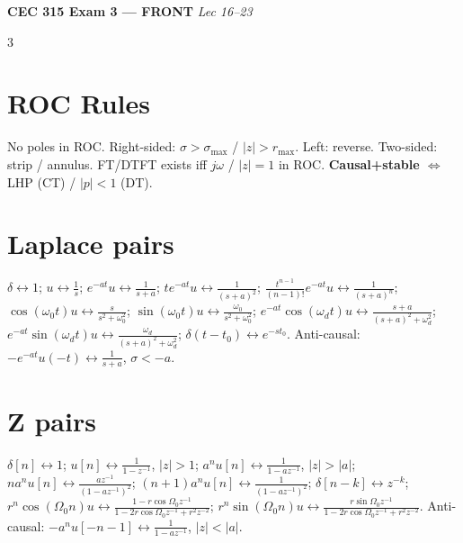 \documentclass[8pt]{extarticle}
\begin{document}
\scriptsize

\begin{center}\textbf{\footnotesize CEC 315 Exam 3 --- FRONT} \hfill \emph{Lec 16--23}\end{center}
\vspace{-4pt}

\begin{multicols*}{3}

\section*{ROC Rules}
No poles in ROC. Right-sided: $\sigma>\sigma_{\max}$ / $|z|>r_{\max}$. Left: reverse. Two-sided: strip / annulus. FT/DTFT exists iff $j\omega$ / $|z|{=}1$ in ROC. \textbf{Causal+stable $\Leftrightarrow$} LHP (CT) / $|p|{<}1$ (DT).

\section*{Laplace pairs}
$\delta\!\leftrightarrow\!1$;
$u\!\leftrightarrow\!\tfrac1s$;
$e^{-at}u\!\leftrightarrow\!\tfrac{1}{s+a}$;
$te^{-at}u\!\leftrightarrow\!\tfrac{1}{(s+a)^2}$;
$\tfrac{t^{n-1}}{(n-1)!}e^{-at}u\!\leftrightarrow\!\tfrac{1}{(s+a)^n}$;
$\cos(\omega_0 t)u\!\leftrightarrow\!\tfrac{s}{s^2+\omega_0^2}$;
$\sin(\omega_0 t)u\!\leftrightarrow\!\tfrac{\omega_0}{s^2+\omega_0^2}$;
$e^{-at}\cos(\omega_d t)u\!\leftrightarrow\!\tfrac{s+a}{(s+a)^2+\omega_d^2}$;
$e^{-at}\sin(\omega_d t)u\!\leftrightarrow\!\tfrac{\omega_d}{(s+a)^2+\omega_d^2}$;
$\delta(t{-}t_0)\!\leftrightarrow\!e^{-st_0}$.
Anti-causal: $-e^{-at}u(-t)\!\leftrightarrow\!\tfrac{1}{s+a}$, $\sigma<-a$.

\section*{Z pairs}
$\delta[n]\!\leftrightarrow\!1$;
$u[n]\!\leftrightarrow\!\tfrac{1}{1-z^{-1}}$, $|z|{>}1$;
$a^nu[n]\!\leftrightarrow\!\tfrac{1}{1-az^{-1}}$, $|z|{>}|a|$;
$na^nu[n]\!\leftrightarrow\!\tfrac{az^{-1}}{(1-az^{-1})^2}$;
$(n{+}1)a^nu[n]\!\leftrightarrow\!\tfrac{1}{(1-az^{-1})^2}$;
$\delta[n{-}k]\!\leftrightarrow\!z^{-k}$;
$r^n\!\cos(\Omega_0 n)u\!\leftrightarrow\!\tfrac{1-r\cos\Omega_0 z^{-1}}{1-2r\cos\Omega_0 z^{-1}+r^2 z^{-2}}$;
$r^n\!\sin(\Omega_0 n)u\!\leftrightarrow\!\tfrac{r\sin\Omega_0 z^{-1}}{1-2r\cos\Omega_0 z^{-1}+r^2 z^{-2}}$.
Anti-causal: $-a^nu[-n{-}1]\!\leftrightarrow\!\tfrac{1}{1-az^{-1}}$, $|z|{<}|a|$.


\end{multicols*}
\end{document}

